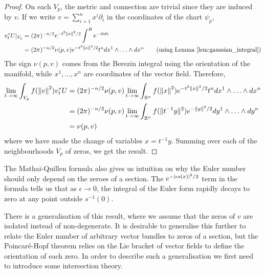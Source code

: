 \begin{proof}
	On each $V_p$, the metric and connection are trivial since they are induced 
	by $v$. If we write $v= \sum_{i=1}^{n} x^i \partial_i$ in the coordinates of
	the chart $\psi_p$,
	\begin{align*}
		v_t^*U |_{V_p} 
		&= (2\pi)^{-n/2} e^{-t^2\norm{x}^2 /2} \int^B e^{-itdv} \\
		&= (2\pi)^{-n/2} \nu(p,v) e^{-t^2\norm{x}^2 /2} t^n dx^1 \wedge
		\ldots\wedge dx^n \tag{using Lemma \ref{lem:gaussian_integral}}
	\end{align*}
	The sign $\nu(p,v)$ comes from the Berezin integral using the orientation of
	the manifold, while $x^1,\ldots,x^n$ are coordinates of the vector field. 
	Therefore, 
	\begin{align*}
		\lim_{t \to \infty} \int_{V_p} f(\norm{v}^2)v_t^*U 
		&= (2\pi)^{-n/2} \nu(p,v) 
		\lim_{t \to \infty} \int_{\mathbb{R}^n}
		f(\norm{x}^2) e^{-t^2\norm{x}^2 /2} t^n dx^1 \wedge \ldots\wedge dx^n\\
		&= (2\pi)^{-n/2} \nu(p,v) 
		\lim_{t \to \infty} \int_{\mathbb{R}^n} 
		f(\norm[*]{t^{-1}y}^2) e^{-\norm{y}^2 /2} dy^1 \wedge \ldots\wedge dy^n\\
		&= \nu(p,v) 
	\end{align*}
	where we have made the change of variables $x=t^{-1}y$. Summing over each of
	the neighbourhoods $V_p$ of zeros, we get the result.
\end{proof}
The Mathai-Quillen formula also gives us intuition on why the Euler number
should only depend on the zeroes of a section. 
The $e^{-\abs{\epsilon s(x)}^2/2}$ term in the formula tells us that as
$\epsilon \to 0$, the integral of the Euler form rapidly decays to zero at any
point outside $s^{-1}(0)$. 

There is a generalisation of this result, where we assume that the zeros
of $v$ are isolated instead of non-degenerate.\cite[Theorem 1.58]{bgv} 
It is desirable to generalise this further to relate the Euler number of
arbitrary vector bundles to zeros of a section, but the Poincar\'e-Hopf theorem
relies on the Lie bracket of vector fields to define the orientation of each
zero. In order to describe such a generalisation we first need to introduce some
intersection theory.

